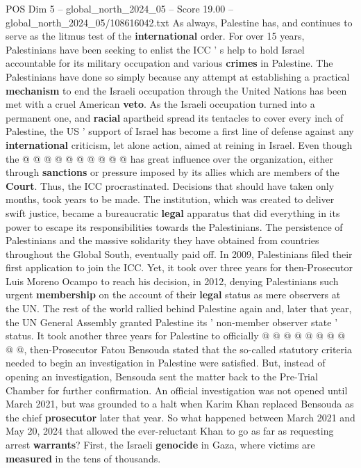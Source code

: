 \begin{textsample}{POS Dim 5 – global\_north\_2024\_05 – Score 19.00 – global\_north\_2024\_05/108616042.txt}
As always, Palestine has, and continues to serve as the litmus test of the \textbf{international} order.
For over 15 years, Palestinians have been seeking to enlist the ICC ' s help to hold Israel accountable for its military occupation and various \textbf{crimes} in Palestine.
The Palestinians have done so simply because any attempt at establishing a practical \textbf{mechanism} to end the Israeli occupation through the United Nations has been met with a cruel American \textbf{veto}.
As the Israeli occupation turned into a permanent one, and \textbf{racial} apartheid spread its tentacles to cover every inch of Palestine, the US ' support of Israel has become a first line of defense against any \textbf{international} criticism, let alone action, aimed at reining in Israel.
Even though the @ @ @ @ @ @ @ @ @ @ has great influence over the organization, either through \textbf{sanctions} or pressure imposed by its allies which are members of the \textbf{Court}.
Thus, the ICC procrastinated.
Decisions that should have taken only months, took years to be made.
The institution, which was created to deliver swift justice, became a bureaucratic \textbf{legal} apparatus that did everything in its power to escape its responsibilities towards the Palestinians.
The persistence of Palestinians and the massive solidarity they have obtained from countries throughout the Global South, eventually paid off.
In 2009, Palestinians filed their first application to join the ICC.
Yet, it took over three years for then-Prosecutor Luis Moreno Ocampo to reach his decision, in 2012, denying Palestinians such urgent \textbf{membership} on the account of their \textbf{legal} status as mere observers at the UN.
The rest of the world rallied behind Palestine again and, later that year, the UN General Assembly granted Palestine its ' non-member observer state ' status.
It took another three years for Palestine to officially @ @ @ @ @ @ @ @ @ @, then-Prosecutor Fatou Bensouda stated that the so-called statutory criteria needed to begin an investigation in Palestine were satisfied.
But, instead of opening an investigation, Bensouda sent the matter back to the Pre-Trial Chamber for further confirmation.
An official investigation was not opened until March 2021, but was grounded to a halt when Karim Khan replaced Bensouda as the chief \textbf{prosecutor} later that year.
So what happened between March 2021 and May 20, 2024 that allowed the ever-reluctant Khan to go as far as requesting arrest \textbf{warrants}?
First, the Israeli \textbf{genocide} in Gaza, where victims are \textbf{measured} in the tens of thousands.

\end{textsample}
